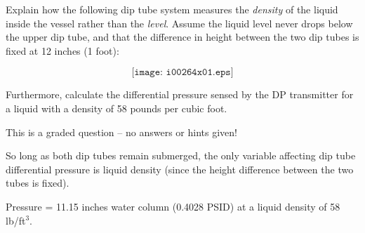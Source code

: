 

Explain how the following dip tube system measures the {\it density} of the liquid inside the vessel rather than the {\it level}.  Assume the liquid level never drops below the upper dip tube, and that the difference in height between the two dip tubes is fixed at 12 inches (1 foot):

$$\texttt{[image: i00264x01.eps]}$$

Furthermore, calculate the differential pressure sensed by the DP transmitter for a liquid with a density of 58 pounds per cubic foot.

\vfil 

\eject






This is a graded question -- no answers or hints given!







So long as both dip tubes remain submerged, the only variable affecting dip tube differential pressure is liquid density (since the height difference between the two tubes is fixed).

\vskip 10pt

Pressure = 11.15 inches water column (0.4028 PSID) at a liquid density of 58 lb/ft$^{3}$.




